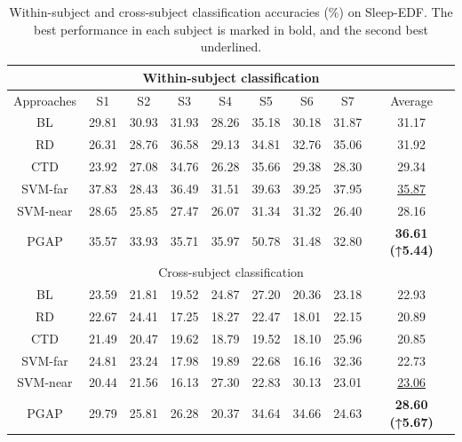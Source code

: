 \documentclass[journal,twocolumn]{IEEEtran}
\begin{document}
\begin{table}[htpb] \centering
  \caption{Within-subject and cross-subject classification accuracies (\%) on Sleep-EDF. The best performance in each subject is marked in bold, and the second best underlined.}
  \label{tab:sleep-edfx-result}
  \begin{tabular}{c|c|c|c|c|c|c|c|c}
  \toprule
  \multicolumn{9}{c}{Within-subject classification} \\
  \midrule
  Approaches & S1 & S2 & S3 & S4 & S5 & S6 & S7 & Average \\
  \midrule
  BL & 29.81 & 30.93 & 31.93 & 28.26 & 35.18 & 30.18 & 31.87 & 31.17 \\
  RD & 26.31 & 28.76 & 36.58 & 29.13 & 34.81 & 32.76 & 35.06 & 31.92 \\
  CTD & 23.92 & 27.08 & 34.76 & 26.28 & 35.66 & 29.38 & 28.30 & 29.34 \\
  SVM-far & 37.83 & 28.43 & 36.49 & 31.51 & 39.63 & 39.25 & 37.95 & \underline{35.87} \\
  SVM-near & 28.65 & 25.85 & 27.47 & 26.07 & 31.34 & 31.32 & 26.40 & 28.16 \\
  PGAP & 35.57 & 33.93 & 35.71 & 35.97 & 50.78 & 31.48 & 32.80 & \textbf{36.61 (↑5.44)} \\
  \midrule
  \multicolumn{9}{c}{Cross-subject classification} \\
  \midrule
  BL & 23.59 & 21.81 & 19.52 & 24.87 & 27.20 & 20.36 & 23.18 & 22.93 \\
  RD & 22.67 & 24.41 & 17.25 & 18.27 & 22.47 & 18.01 & 22.15 & 20.89 \\
  CTD & 21.49 & 20.47 & 19.62 & 18.79 & 19.52 & 18.10 & 25.96 & 20.85 \\
  SVM-far & 24.81 & 23.24 & 17.98 & 19.89 & 22.68 & 16.16 & 32.36 & 22.73 \\
  SVM-near & 20.44 & 21.56 & 16.13 & 27.30 & 22.83 & 30.13 & 23.01 & \underline{23.06} \\
  PGAP & 29.79 & 25.81 & 26.28 & 20.37 & 34.64 & 34.66 & 24.63 & \textbf{28.60 (↑5.67)} \\
  \bottomrule
  \end{tabular}
\end{table}
\end{document}
